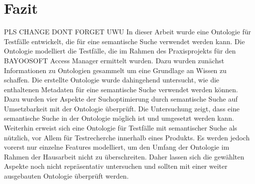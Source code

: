 \chapter{Fazit}
PLS CHANGE DONT FORGET UWU In dieser Arbeit wurde eine Ontologie für Testfälle entwickelt, die für eine semantische Suche verwendet werden kann. Die Ontologie modelliert die Testfälle, die im Rahmen des Praxisprojekts für den BAYOOSOFT Access Manager ermittelt wurden. Dazu wurden zunächst Informationen zu Ontologien gesammelt um eine Grundlage an Wissen zu schaffen. Die erstellte Ontologie wurde dahingehend untersucht, wie die enthaltenen Metadaten für eine semantische Suche verwendet werden können. Dazu wurden vier Aspekte der Suchoptimierung durch semantische Suche auf Umsetzbarkeit mit der Ontologie überprüft. Die Untersuchung zeigt, dass eine semantische Suche in der Ontologie möglich ist und umgesetzt werden kann. Weiterhin erweist sich eine Ontologie für Testfälle mit semantischer Suche als nützlich, vor Allem für Testrecherche innerhalb eines Produkts. Es werden jedoch vorerst nur einzelne Features modelliert, um den Umfang der Ontologie im Rahmen der Hausarbeit nicht zu überschreiten. Daher lassen sich die gewählten Aspekte noch nicht repräsentativ untersuchen und sollten mit einer weiter ausgebauten Ontologie überprüft werden.